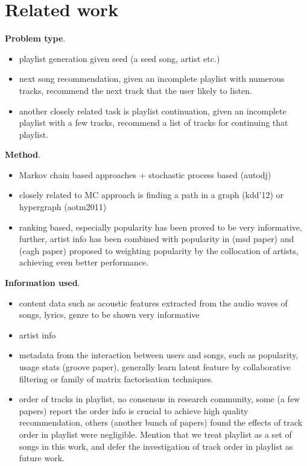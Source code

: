 \section{Related work}
\label{sec:related}


{\bf Problem type}.
\begin{itemize}
\item playlist generation given seed (\eg a seed song, artist etc.)
\item next song recommendation, given an incomplete playlist with numerous tracks, recommend the next track that the user likely to listen.
\item another closely related task is playlist continuation, given an incomplete playlist with a few tracks, recommend a list of tracks for continuing that playlist.
\end{itemize}


{\bf Method}.
\begin{itemize}
\item Markov chain based approaches + stochastic process based (\ie autodj)
\item closely related to MC approach is finding a path in a graph (\ie kdd'12) or hypergraph (\ie aotm2011)
\item ranking based, especially popularity has been proved to be very informative, further, 
artist info has been combined with popularity in (msd paper) and (cagh paper) proposed to weighting popularity by the collocation of artists, 
achieving even better performance.
\end{itemize}


{\bf Information used}.
\begin{itemize}
\item content data such as acoustic features extracted from the audio waves of songs, lyrics, genre to be shown very informative
\item artist info
\item metadata from the interaction between users and songs, such as popularity, usage stats (groove paper), generally learn latent feature 
by collaborative filtering or family of matrix factorisation techniques.
\item order of tracks in playlist, no consensus in research community, some (a few papers) report the order info is crucial to achieve high quality recommendation,
others (another bunch of papers) found the effects of track order in playlist were negligible.
Mention that we treat playlist as a set of songs in this work, and defer the investigation of track order in playlist as future work.
\end{itemize}


